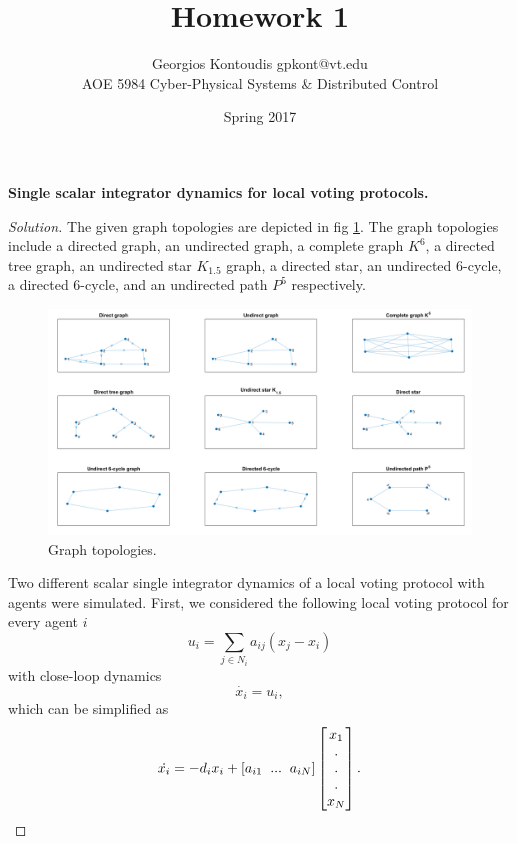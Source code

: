 \documentclass[12pt]{article}
\newenvironment{exercise}[2][Exercise]{\begin{trivlist}
\item[\hskip \labelsep {\bfseries #1}\hskip \labelsep {\bfseries #2.}]}{\end{trivlist}}
\newenvironment{solution}{\begin{proof}[Solution]}{\end{proof}}
\begin{document}
 
 
\title{Homework 1}
\author{Georgios Kontoudis \textbullet{} gpkont@vt.edu\\ 
AOE 5984 Cyber-Physical Systems \& Distributed Control} 
\date{Spring 2017}
 
\maketitle
\begin{exercise}{1} %
\textbf{Single scalar integrator dynamics for local voting protocols.}
\end{exercise}
\begin{solution}
The given graph topologies are depicted in fig \ref{graphs}. The graph topologies include a directed graph, an undirected graph, a complete graph $K^6$, a directed tree graph, an undirected star $K_{1.5}$ graph, a directed star, an undirected 6-cycle, a directed 6-cycle, and an undirected path $P^5$ respectively.
\begin{figure}[!h]
	\includegraphics[scale=0.31]{figures/Graphs.png}
	\centering
	\caption{Graph topologies.}
	\label{graphs}
\end{figure}

Two different scalar single integrator dynamics of a local voting protocol with agents were simulated. First, we considered the following local voting protocol for every agent $i$
\begin{equation*}
u_i = \sum_{j \in N_i}a_{ij}(x_j-x_i)
\end{equation*}
with close-loop dynamics 
\begin{equation*}
\dot{x_i} = u_i,
\end{equation*}
which can be simplified as
\begin{equation*}
\dot{x_i} = -d_ix_i + [a_{i1}\hspace{.2cm}...\hspace{.2cm}a_{iN}]\begin{bmatrix}
x_1\\
.\\
.\\
.\\
x_N
\end{bmatrix}.
\end{equation*}


\end{solution}
\end{document}

